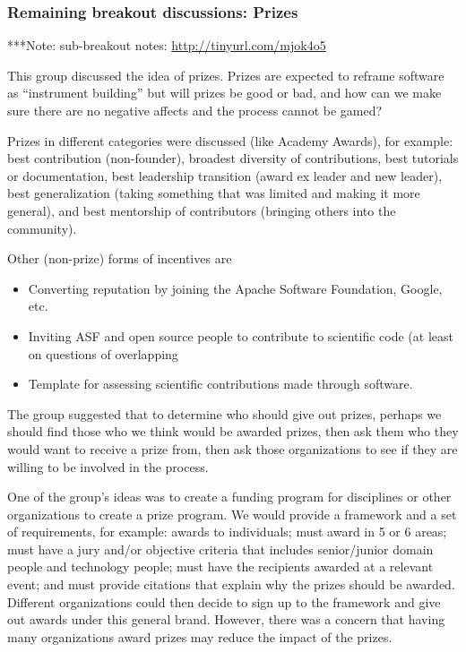 \documentclass[11pt, oneside]{amsart}
\newcommand{\note}[1]{ {\textcolor{blueish}    { ***Note:      #1 }}}
\begin{document}
\subsubsection{Remaining breakout discussions: Prizes}\label{sec:prizes}
\note{sub-breakout notes: \url{http://tinyurl.com/mjok4o5}}

This group discussed the idea of prizes. Prizes are expected to reframe software
as ``instrument building'' but will prizes be good or bad, and how can we make
sure there are no negative affects and the process cannot be gamed?

Prizes in different categories were discussed (like Academy Awards), for
example: best contribution (non-founder), broadest diversity of contributions,
best tutorials or documentation, best leadership transition (award ex leader and
new leader), best generalization (taking something that was limited and making
it more general), and best mentorship of contributors (bringing others into the
community).

Other (non-prize) forms of incentives are
\begin{itemize}
\item Converting reputation by joining the Apache Software Foundation, Google, etc.
\item Inviting ASF and open source people to contribute to scientific code (at
least on questions of overlapping
\item Template for assessing scientific contributions made through software.
\end{itemize}

The group suggested that to determine who should give out prizes, perhaps we
should find those who we think would be awarded prizes, then ask them who they
would want to receive a prize from, then ask those organizations to see if they
are willing to be involved in the process.

One of the group's ideas was to create a funding program for disciplines or
other organizations to create a prize program. We would provide a framework and
a set of requirements, for example: awards to individuals; must award in 5 or 6
areas; must have a jury and/or objective criteria that includes senior/junior
domain people and technology people; must have the recipients awarded at a
relevant event; and must provide citations that explain why the prizes should be
awarded. Different organizations could then decide to sign up to the framework
and give out awards under this general brand. However, there was a concern that
having many organizations award prizes may reduce the impact of the prizes.
\end{document}
